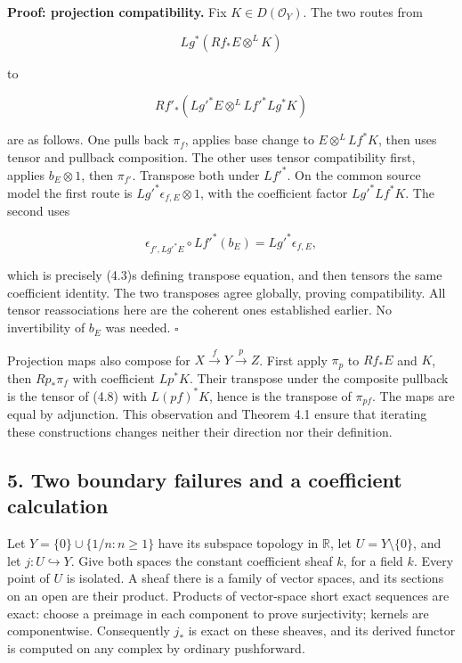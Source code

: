 \documentclass[
  english,
  11pt,
  a4paper,
]{article}
\begin{document}
\textbf{Proof: projection compatibility.} Fix \(K\in D(\mathcal O_Y)\).
The two routes from

\[Lg^*(Rf_*E\otimes^L K)\]

to

\[Rf'_*(Lg'^*E\otimes^L Lf'^*Lg^*K)
\tag{4.9}\]

are as follows. One pulls back \(\pi_f\), applies base change to
\(E\otimes^L Lf^*K\), then uses tensor and pullback composition. The
other uses tensor compatibility first, applies \(b_E\otimes1\), then
\(\pi_{f'}\). Transpose both under \(Lf'^*\). On the common source model
the first route is \(Lg'^*\epsilon_{f,E}\otimes1\), with the coefficient
factor \(Lg'^*Lf^*K\). The second uses

\[\epsilon_{f',Lg'^*E}\circ Lf'^*(b_E)
=Lg'^*\epsilon_{f,E},
\tag{4.10}\]

which is precisely (4.3)\textquotesingle s defining transpose equation,
and then tensors the same coefficient identity. The two transposes agree
globally, proving compatibility. All tensor reassociations here are the
coherent ones established earlier. No invertibility of \(b_E\) was
needed. \(\square\)

Projection maps also compose for \(X\xrightarrow fY\xrightarrow pZ\).
First apply \(\pi_p\) to \(Rf_*E\) and \(K\), then \(Rp_*\pi_f\) with
coefficient \(Lp^*K\). Their transpose under the composite pullback is
the tensor of (4.8) with \(L(pf)^*K\), hence is the transpose of
\(\pi_{pf}\). The maps are equal by adjunction. This observation and
Theorem 4.1 ensure that iterating these constructions changes neither
their direction nor their definition.

\subsection{5. Two boundary failures and a coefficient
calculation}\label{projection-formula-and-base-change--5-two-boundary-failures-and-a-coefficient-calculation}

Let \(Y=\{0\}\cup\{1/n:n\ge1\}\) have its subspace topology in
\(\mathbb R\), let \(U=Y\setminus\{0\}\), and let
\(j:U\hookrightarrow Y\). Give both spaces the constant coefficient
sheaf \(k\), for a field \(k\). Every point of \(U\) is isolated. A
sheaf there is a family of vector spaces, and its sections on an open
are their product. Products of vector-space short exact sequences are
exact: choose a preimage in each component to prove surjectivity;
kernels are componentwise. Consequently \(j_*\) is exact on these
sheaves, and its derived functor is computed on any complex by ordinary
pushforward.
\end{document}
